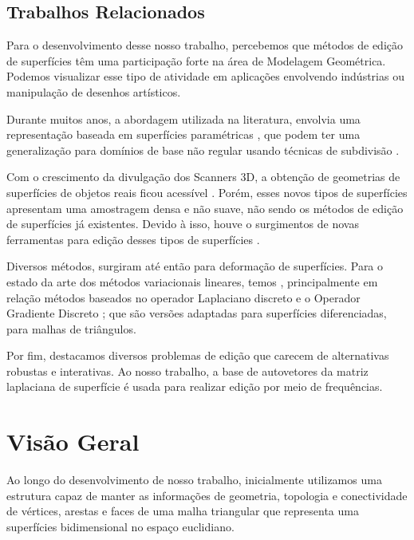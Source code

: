 \subsection{Trabalhos Relacionados}

Para o desenvolvimento desse nosso trabalho, percebemos que métodos de edição de superfícies têm uma participação forte na área de Modelagem Geométrica. Podemos visualizar esse tipo de atividade em aplicações envolvendo indústrias ou manipulação de desenhos artísticos.

Durante muitos anos, a abordagem utilizada na literatura, envolvia uma representação baseada em superfícies paramétricas \cite{FarinG}, que podem ter uma generalização para domínios de base não regular usando técnicas de subdivisão \cite{SCHRZORI}.

Com o crescimento da divulgação dos Scanners 3D, a obtenção de geometrias de superfícies de objetos reais ficou acessível \cite{NEUGEBAUER}. Porém, esses novos tipos de superfícies apresentam uma amostragem densa e não suave, não sendo os métodos de edição de superfícies já existentes. Devido à isso, houve o surgimentos de novas ferramentas para edição desses tipos de superfícies .

Diversos métodos, surgiram até então para deformação de superfícies. Para o estado da arte dos métodos variacionais lineares, temos  \cite{Olga}, principalmente em relação métodos baseados no operador Laplaciano discreto \cite{Lang} e o Operador Gradiente Discreto \cite{Yu:2004}; que são versões adaptadas para superfícies diferenciadas, para malhas de triângulos.

Por fim, destacamos diversos problemas de edição que carecem de alternativas robustas e interativas. Ao nosso trabalho, a base de autovetores da matriz laplaciana de superfície é usada para realizar edição por meio de frequências.

\section{Visão Geral}

Ao longo do desenvolvimento de nosso trabalho, inicialmente utilizamos uma estrutura \cite{che05} capaz de manter as informações de geometria, topologia e conectividade de vértices, arestas e faces de uma malha triangular que representa uma superfícies bidimensional no espaço euclidiano.

